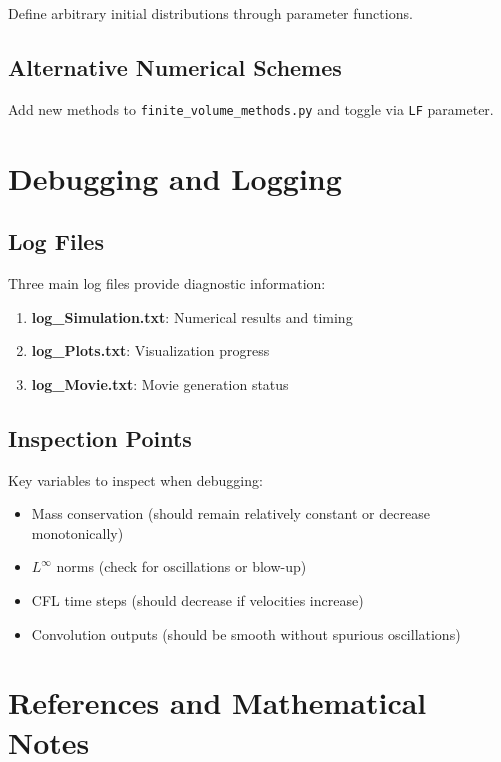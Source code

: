 \documentclass[12pt,a4paper]{report}
\begin{document}
Define arbitrary initial distributions through parameter functions.

\section{Alternative Numerical Schemes}

Add new methods to \texttt{finite\_volume\_methods.py} and toggle via \texttt{LF} parameter.

\chapter{Debugging and Logging}

\section{Log Files}

Three main log files provide diagnostic information:

\begin{enumerate}
    \item \textbf{log\_Simulation.txt}: Numerical results and timing
    \item \textbf{log\_Plots.txt}: Visualization progress
    \item \textbf{log\_Movie.txt}: Movie generation status
\end{enumerate}

\section{Inspection Points}

Key variables to inspect when debugging:

\begin{itemize}
    \item Mass conservation (should remain relatively constant or decrease monotonically)
    \item $L^\infty$ norms (check for oscillations or blow-up)
    \item CFL time steps (should decrease if velocities increase)
    \item Convolution outputs (should be smooth without spurious oscillations)
\end{itemize}

\chapter{References and Mathematical Notes}
\end{document}
